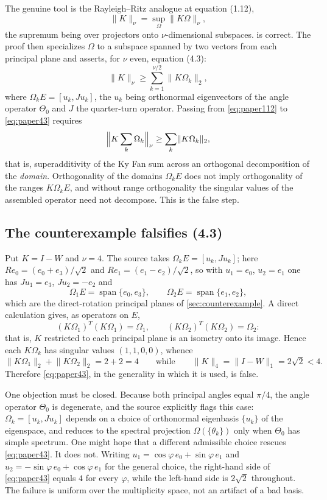 \documentclass[11pt]{article}
\theoremstyle{definition}
\newcommand{\trnorm}[1]{\lVert #1\rVert_1}
\newcommand{\spanof}{\operatorname{span}}
\begin{document}
The genuine tool is the Rayleigh--Ritz analogue at equation (1.12),
\begin{equation}
\label{eq:paper112}
 \lVert K\rVert_\nu=\sup_\Omega\lVert K\Omega\rVert_\nu,
\end{equation}
the supremum being over projectors onto $\nu$-dimensional subspaces.
 is correct.  The proof then specializes $\Omega$ to a
subspace spanned by two vectors from each principal plane and asserts, for
$\nu$ even, equation (4.3):
\begin{equation}
\label{eq:paper43}
 \lVert K\rVert_\nu
 \geq
 \sum_{k=1}^{\nu/2}\lVert K\Omega_k\rVert_2,
\end{equation}
where $\Omega_kE=[u_k,Ju_k]$, the $u_k$ being orthonormal eigenvectors of the
angle operator $\Theta_0$ and $J$ the quarter-turn operator.  Passing from
\cref{eq:paper112} to \cref{eq:paper43} requires
\[
 \Bigl\lVert K\sum_k\Omega_k\Bigr\rVert_\nu
 \geq\sum_k\lVert K\Omega_k\rVert_2 ,
\]
that is, superadditivity of the Ky Fan sum across an orthogonal decomposition
of the \emph{domain}.  Orthogonality of the domains $\Omega_kE$ does not imply
orthogonality of the ranges $K\Omega_kE$, and without range orthogonality the
singular values of the assembled operator need not decompose.  This is the
false step.

\subsection{The counterexample falsifies (4.3)}

Put $K=I-W$ and $\nu=4$.  The source takes $\Omega_kE=[u_k,Ju_k]$; here
$R e_0=(e_0+e_3)/\sqrt2$ and $Re_1=(e_1-e_2)/\sqrt2$, so with $u_1=e_0$,
$u_2=e_1$ one has $Ju_1=e_3$, $Ju_2=-e_2$ and
\[
 \Omega_1E=\spanof\{e_0,e_3\},
 \qquad
 \Omega_2E=\spanof\{e_1,e_2\},
\]
which are the direct-rotation principal planes of \cref{sec:counterexample}.
A direct calculation gives, as operators on $E$,
\[
 (K\Omega_1)^T(K\Omega_1)=\Omega_1,
 \qquad
 (K\Omega_2)^T(K\Omega_2)=\Omega_2 :
\]
that is, $K$ restricted to each principal plane is an isometry onto its image.
Hence each $K\Omega_k$ has singular values $(1,1,0,0)$, whence
\[
 \lVert K\Omega_1\rVert_2+\lVert K\Omega_2\rVert_2=2+2=4
 \qquad\text{while}\qquad
 \lVert K\rVert_4=\trnorm{I-W}=2\sqrt2<4 .
\]
Therefore \cref{eq:paper43}, in the generality in which it is used, is false.

One objection must be closed.  Because both principal angles equal $\pi/4$, the
angle operator $\Theta_0$ is degenerate, and the source explicitly flags this
case: $\Omega_k=[u_k,Ju_k]$ depends on a choice of orthonormal eigenbasis
$\{u_k\}$ of the eigenspace, and reduces to the spectral projection
$\Omega(\{\theta_k\})$ only when $\Theta_0$ has simple spectrum.  One might
hope that a different admissible choice rescues \cref{eq:paper43}.  It does
not.  Writing $u_1=\cos\varphi\,e_0+\sin\varphi\,e_1$ and
$u_2=-\sin\varphi\,e_0+\cos\varphi\,e_1$ for the general choice, the right-hand
side of \cref{eq:paper43} equals $4$ for every $\varphi$, while the left-hand
side is $2\sqrt2$ throughout.  The failure is uniform over the multiplicity
space, not an artifact of a bad basis.
\end{document}
